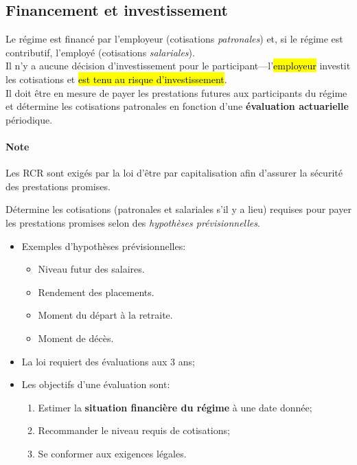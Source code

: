 \documentclass[10pt, french]{article}
\begin{document}
\begin{multicols*}{3}
\subsection*{Financement et investissement}

Le régime est financé par l'employeur (cotisations \textit{patronales}) et, si le régime est contributif, l'employé (cotisations \textit{salariales}).\\

Il n'y a aucune décision d'investissement pour le participant---l'\hl{employeur} investit les cotisations et \hl{est tenu au risque d'investissement}. \\

Il doit être en mesure de payer les prestations futures aux participants du régime et détermine les cotisations patronales en fonction d'une \textbf{évaluation actuarielle} périodique. 

\paragraph*{Note}	Les RCR sont exigés par la loi d'être par capitalisation afin d'assurer la sécurité des prestations promises.

\begin{definitionNOHFILLsub}
Détermine les cotisations (patronales et salariales s'il y a lieu) requises pour payer les prestations promises selon des \textit{hypothèses prévisionnelles}.

\begin{itemize}[leftmargin = *]
	\item	Exemples d'hypothèses prévisionnelles:
		\begin{itemize}[leftmargin = *]
		\item	Niveau futur des salaires.
		\item	Rendement des placements.
		\item	Moment du départ à la retraite.
		\item	Moment de décès.
		\end{itemize}
	\item	La loi requiert des évaluations aux 3 ans;
	\item	Les objectifs d'une évaluation sont:
		\begin{enumerate}
		\item	Estimer la \textbf{situation financière du régime} à une date donnée;
		\item	Recommander le niveau requis de cotisations;
		\item	Se conformer aux exigences légales.
		\end{enumerate}
\end{itemize}
\end{definitionNOHFILLsub}


\end{multicols*}
\end{document}
